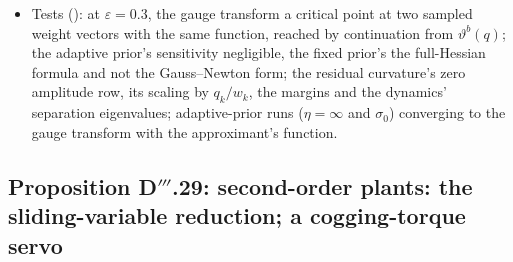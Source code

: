 \begin{itemize}
    $6\cdot10^{-4}$ inside it the approach is slow.
  \item Tests (): at $\varepsilon=0.3$, the gauge transform a critical point at two
    sampled weight vectors with the same function, reached by continuation from $\vartheta^b(q)$; the adaptive prior's
    sensitivity negligible, the fixed prior's the full-Hessian formula and not the Gauss--Newton form; the residual
    curvature's zero amplitude row, its scaling by $q_k/w_k$, the margins and the dynamics' separation eigenvalues;
    adaptive-prior runs ($\eta=\infty$ and $\sigma_0$) converging to the gauge transform with the approximant's
    function.
\end{itemize}

\subsection{Proposition D\texorpdfstring{$'''$}{'''}.29: second-order plants: the sliding-variable reduction; a
cogging-torque servo}

